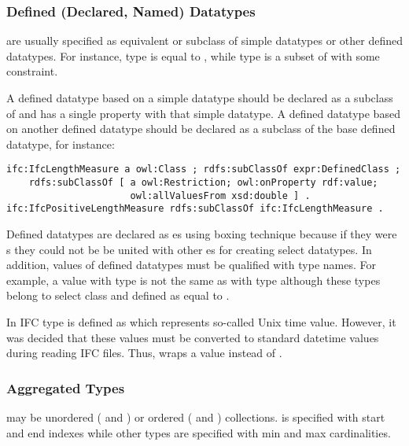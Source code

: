 \subsubsection{Defined (Declared, Named) Datatypes} are usually specified as equivalent or subclass of simple data\-types or other defined data\-types. For instance, type  is equal to , while type  is a subset of  with some constraint.

A defined data\-type based on a simple data\-type should be declared as a subclass of  and has a single property  with that simple data\-type. A defined data\-type based on another defined data\-type should be declared as a subclass of the base defined data\-type, for instance:

\begin{lstlisting}
ifc:IfcLengthMeasure a owl:Class ; rdfs:subClassOf expr:DefinedClass ;
    rdfs:subClassOf [ a owl:Restriction; owl:onProperty rdf:value;
                      owl:allValuesFrom xsd:double ] .
ifc:IfcPositiveLengthMeasure rdfs:subClassOf ifc:IfcLengthMeasure .
\end{lstlisting}


Defined data\-types are declared as es using boxing technique because if they were s they could not be be united with other es for creating select data\-types. In addition, values of defined data\-types must be qualified with type names. For example, a  value with type  is not the same as with type  although these types belong to select class  and defined as equal to .

In IFC type  is defined as  which represents so-called Unix time value. However, it was decided that these values must be converted to standard datetime values during reading IFC files. Thus,  wraps a  value instead of .



\subsubsection{Aggregated Types} may be unordered ( and ) or  ordered ( and ) collections. %
 is specified with start and end indexes while other types are specified with min and max cardinalities.

